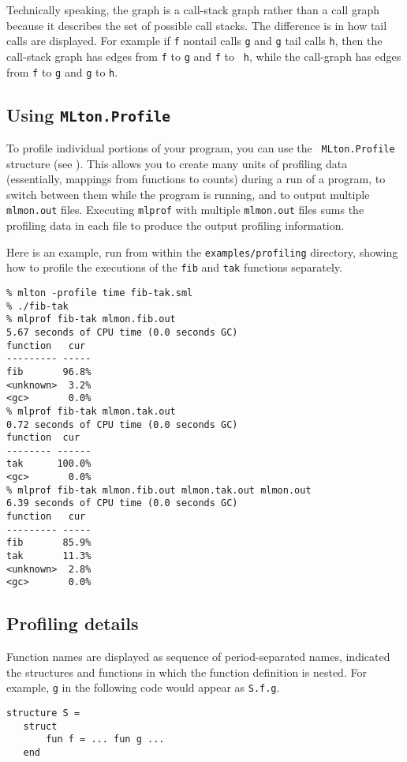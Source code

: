 Technically speaking, the graph is a call-stack graph rather than a
call graph because it describes the set of possible call stacks.  The
difference is in how tail calls are displayed.  For example if {\tt f}
nontail calls {\tt g} and {\tt g} tail calls {\tt h}, then the
call-stack graph has edges from {\tt f} to {\tt g} and {\tt f} to {\tt
h}, while the call-graph has edges from {\tt f} to {\tt g} and {\tt g}
to {\tt h}.

\subsection{Using {\tt MLton.Profile}}

To profile individual portions of your program, you can use the {\tt
MLton.Profile} structure (see ).  This
allows you to create many units of profiling data (essentially,
mappings from functions to counts) during a run of a program, to
switch between them while the program is running, and to output
multiple {\tt mlmon.out} files.  Executing {\tt mlprof} with multiple
{\tt mlmon.out} files sums the profiling data in each file to produce
the output profiling information.

Here is an example, run from within the {\tt examples/profiling}
directory, showing how to profile the executions of the {\tt fib} and
{\tt tak} functions separately.

\begin{verbatim}
% mlton -profile time fib-tak.sml
% ./fib-tak
% mlprof fib-tak mlmon.fib.out
5.67 seconds of CPU time (0.0 seconds GC)
function   cur 
--------- -----
fib       96.8%
<unknown>  3.2%
<gc>       0.0%
% mlprof fib-tak mlmon.tak.out
0.72 seconds of CPU time (0.0 seconds GC)
function  cur  
-------- ------
tak      100.0%
<gc>       0.0%
% mlprof fib-tak mlmon.fib.out mlmon.tak.out mlmon.out
6.39 seconds of CPU time (0.0 seconds GC)
function   cur 
--------- -----
fib       85.9%
tak       11.3%
<unknown>  2.8%
<gc>       0.0%
\end{verbatim}

\subsection{Profiling details}

Function names are displayed as sequence of period-separated names,
indicated the structures and functions in which the function
definition is nested.  For example, {\tt g} in the following code
would appear as {\tt S.f.g}.
\begin{verbatim}
structure S =
   struct
       fun f = ... fun g ...
   end
\end{verbatim}

